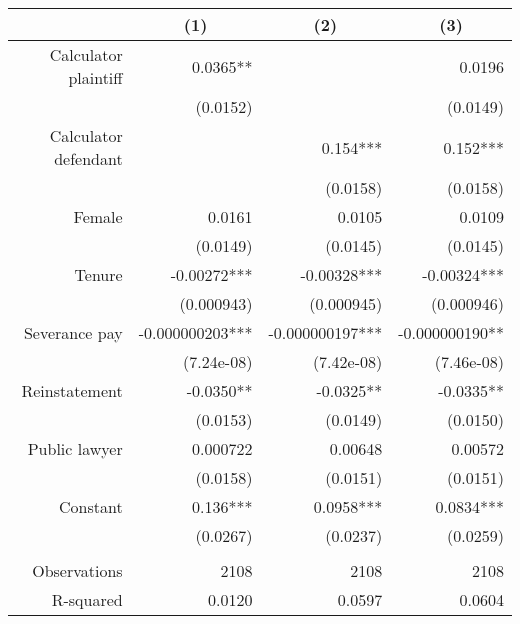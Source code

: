 \begin{tabular}{rrrr}
\toprule
\multicolumn{1}{c}{} & \multicolumn{1}{c}{(1)} & \multicolumn{1}{c}{(2)} & \multicolumn{1}{c}{(3)} \\
\midrule
Calculator plaintiff & 0.0365** &       & 0.0196 \\
      & (0.0152) &       & (0.0149) \\
Calculator defendant &       & 0.154*** & 0.152*** \\
      &       & (0.0158) & (0.0158) \\
Female & 0.0161 & 0.0105 & 0.0109 \\
      & (0.0149) & (0.0145) & (0.0145) \\
Tenure & -0.00272*** & -0.00328*** & -0.00324*** \\
      & (0.000943) & (0.000945) & (0.000946) \\
Severance pay & -0.000000203*** & -0.000000197*** & -0.000000190** \\
      & (7.24e-08) & (7.42e-08) & (7.46e-08) \\
Reinstatement & -0.0350** & -0.0325** & -0.0335** \\
      & (0.0153) & (0.0149) & (0.0150) \\
Public lawyer & 0.000722 & 0.00648 & 0.00572 \\
      & (0.0158) & (0.0151) & (0.0151) \\
Constant  & 0.136*** & 0.0958*** & 0.0834*** \\
      & (0.0267) & (0.0237) & (0.0259) \\
      &       &       &  \\
Observations & 2108  & 2108  & 2108 \\
R-squared & 0.0120 & 0.0597 & 0.0604 \\
\bottomrule
\end{tabular}%
